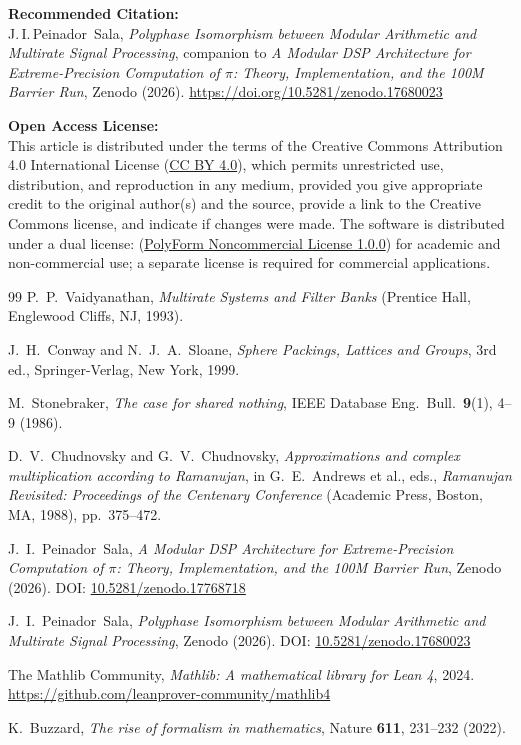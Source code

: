 \documentclass{article}
\theoremstyle{plain}
\theoremstyle{definition}
\theoremstyle{remark}
\begin{document}
\noindent\textbf{Recommended Citation:} \\
J.\,I.\,Peinador~Sala, \emph{Polyphase Isomorphism between Modular Arithmetic and Multirate Signal Processing}, companion to \emph{A Modular DSP Architecture for Extreme-Precision Computation of \(\pi\): Theory, Implementation, and the 100M Barrier Run}, Zenodo (2026). \url{https://doi.org/10.5281/zenodo.17680023}

\vspace{1em}
\noindent\textbf{Open Access License:} \\
This article is distributed under the terms of the Creative Commons Attribution 4.0 International License (\href{https://creativecommons.org/licenses/by/4.0/}{CC BY 4.0}), which permits unrestricted use, distribution, and reproduction in any medium, provided you give appropriate credit to the original author(s) and the source, provide a link to the Creative Commons license, and indicate if changes were made.
The software is distributed under a dual license: (\href{https://polyformproject.org/licenses/noncommercial/1.0.0}{PolyForm Noncommercial License 1.0.0}) for academic and non-commercial use; a separate license is required for commercial applications.

\begin{thebibliography}{99}
P.~P.~Vaidyanathan, 
\emph{Multirate Systems and Filter Banks} 
(Prentice Hall, Englewood Cliffs, NJ, 1993).

J.~H.~Conway and N.~J.~A.~Sloane, 
\emph{Sphere Packings, Lattices and Groups}, 
3rd ed., Springer-Verlag, New York, 1999. 

M.~Stonebraker, 
\emph{The case for shared nothing}, 
IEEE Database Eng.\ Bull.\ \textbf{9}(1), 4--9 (1986).

D.~V.~Chudnovsky and G.~V.~Chudnovsky, 
\emph{Approximations and complex multiplication according to Ramanujan}, 
in G.~E.~Andrews et al., eds., 
\emph{Ramanujan Revisited: Proceedings of the Centenary Conference} 
(Academic Press, Boston, MA, 1988), pp.~375--472.

J.~I.~Peinador~Sala, 
\emph{A Modular DSP Architecture for Extreme-Precision Computation of \(\pi\): Theory, Implementation, and the 100M Barrier Run}, 
Zenodo (2026). 
DOI: \href{https://doi.org/10.5281/zenodo.17768718}{10.5281/zenodo.17768718}

J.~I.~Peinador~Sala, 
\emph{Polyphase Isomorphism between Modular Arithmetic and Multirate Signal Processing}, 
Zenodo (2026).
DOI: \href{https://doi.org/10.5281/zenodo.17680023}{10.5281/zenodo.17680023}

The Mathlib Community, 
\emph{Mathlib: A mathematical library for Lean 4}, 
2024. 
\url{https://github.com/leanprover-community/mathlib4}

K.~Buzzard, 
\emph{The rise of formalism in mathematics}, 
Nature \textbf{611}, 231--232 (2022).

\end{thebibliography}
\end{document}
